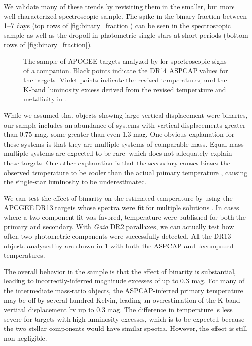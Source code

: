 \documentclass[manuscript]{aastex6}
\newcommand{\Gaia}{\mbox{\textit{Gaia}}}
\begin{document}
We validate many of these trends by revisiting them in the smaller, but more
well-characterized spectroscopic sample. The spike in the binary fraction
between 1--7 days (top rows of \cref{fig:binary_fraction}) can be seen in the 
spectroscopic sample as well as the dropoff in photometric single stars at
short periods (bottom rows of \cref{fig:binary_fraction}).

\begin{figure}[htb]
    \centering
    \caption{The sample of APOGEE targets analyzed by \citet{ElBadry18b} for
    spectroscopic signs of a companion. Black points indicate the DR14 ASPCAP
values for the targets. Violet points indicate the revised temperatures, and the
K-band luminosity excess derived from the revised temperature and metallicity
in \citet{ElBadry18b}.}
    \label{fig:elbadry_excess}
\end{figure}

While we assumed that objects showing large vertical displacement were
binaries, our sample includes an abundance of systems with vertical
displacements greater than 0.75 mag, some greater than even 1.3 mag. One
obvious explanation for these systems is that they are multiple systems of
comparable mass. Equal-mass multiple systems are expected to be rare, which
does not adequately explain these targets. One other explanation is that the 
secondary causes biases the observed temperature to be cooler than the actual 
primary temperature \citep{Pinsonneault12,ElBadry18a}, causing the single-star 
luminosity to be underestimated. 

We can test the effect of binarity on the estimated temperature by using the
APOGEE DR13 targets whose spectra were fit for multiple solutions
\citep{ElBadry18b}. In cases where a two-component fit was favored, temperature
were published for both the primary and secondary. With \Gaia{} DR2 parallaxes,
we can actually test how often two photometric components were successfully
detected. All the DR13 objects analyzed by \citet{ElBadry18b} are shown in
\cref{fig:elbadry_excess} with both the ASPCAP and decomposed temperatures.

The overall behavior in the \citet{ElBadry18b} sample is that the effect of 
binarity is substantial, leading to incorrectly-inferred magnitude excesses of
up to 0.3 mag. For many of the intermediate mass-ratio objects, the 
ASPCAP-inferred primary temperature may be off by several hundred Kelvin, 
leading an overestimation of the K-band vertical displacement by up to 0.3 
mag. The difference in temperature is less severe for targets with high 
luminosity excesses, which is to be expected because the two stellar 
components would have similar spectra. However, the effect is still 
non-negligible.
\end{document}
